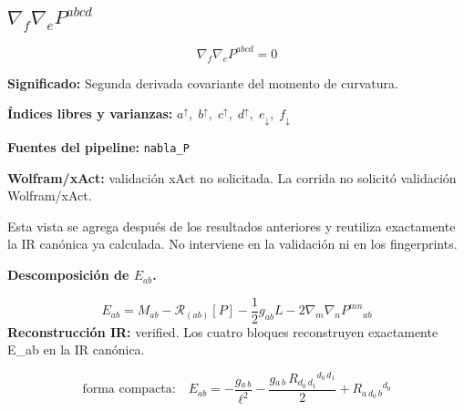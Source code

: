 \documentclass[11pt]{article}
\begin{document}
\subsection*{$ \nabla_f\nabla_e P^{abcd} $}
\begin{dmath*}[breakdepth={5}]
\nabla_f\nabla_e P^{abcd} = 0
\end{dmath*}
\par\vspace{1.2\baselineskip}\noindent
\begin{minipage}{\linewidth}
\textbf{Significado:} Segunda derivada covariante del momento de curvatura.\par
\textbf{Índices libres y varianzas:} $ a^{\uparrow},\;b^{\uparrow},\;c^{\uparrow},\;d^{\uparrow},\;e_{\downarrow},\;f_{\downarrow} $\par
\textbf{Fuentes del pipeline:} \texttt{nabla\_P}\par
\textbf{Wolfram/xAct:} validación xAct no solicitada. La corrida no solicitó validación Wolfram/xAct.\par
\end{minipage}
\par\bigskip{}\par
Esta vista se agrega después de los resultados anteriores y reutiliza exactamente la IR canónica ya calculada. No interviene en la validación ni en los fingerprints.\par
{}
\par\medskip\noindent\textbf{Descomposición de $ E_{ab} $.}\par
\begin{dmath*}[breakdepth={5}]
E_{ab}=M_{ab}-\mathcal{R}_{(ab)}[P]-\frac{1}{2}g_{ab}L-2\nabla_m\nabla_nP^{mn}{}_{ab}
\end{dmath*}
\textbf{Reconstrucción IR:} verified. Los cuatro bloques reconstruyen exactamente E\_ab en la IR canónica.\par
\begin{dmath*}[breakdepth={5}]
\text{forma compacta:}\quad E_{ab} = -\frac{g{}_{a\,b}}{{\ell}^{2}} - \frac{g{}_{a\,b}\,R{}_{d_{0}\,d_{1}}{}^{d_{0}\,d_{1}}}{2} + R{}_{a\,d_{0}\,b}{}^{d_{0}}
\end{dmath*}
\end{document}
